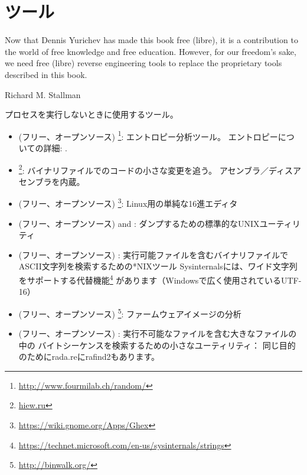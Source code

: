 \chapter{ツール}

\epigraph{Now that Dennis Yurichev has made this book free (libre), it is a
contribution to the world of free knowledge and free education.
However, for our freedom's sake, we need free (libre) reverse
engineering tools to replace the proprietary tools described in this book.}{Richard M. Stallman}


プロセスを実行しないときに使用するツール。


\begin{itemize}
\item
(フリー、オープンソース) \footnote{\url{http://www.fourmilab.ch/random/}}: エントロピー分析ツール。
エントロピーについての詳細: .

\item
\label{Hiew}
\footnote{\href{http://go.yurichev.com/17035}{hiew.ru}}:
バイナリファイルでのコードの小さな変更を追う。
アセンブラ／ディスアセンブラを内蔵。

\item (フリー、オープンソース) \footnote{\url{https://wiki.gnome.org/Apps/Ghex}}: Linux用の単純な16進エディタ

\item (フリー、オープンソース)  and : ダンプするための標準的なUNIXユーティリティ

\item (フリー、オープンソース) : 実行可能ファイルを含むバイナリファイルでASCII文字列を検索するための*NIXツール
Sysinternalsには、ワイド文字列をサポートする代替機能\footnote{\url{https://technet.microsoft.com/en-us/sysinternals/strings}}
があります（Windowsで広く使用されているUTF-16）

\item (フリー、オープンソース) \footnote{\url{http://binwalk.org/}}: ファームウェアイメージの分析

\item
{}
(フリー、オープンソース) :
実行不可能なファイルを含む大きなファイルの中の
バイトシーケンスを検索するための小さなユーティリティ：\BGREPURL
{}
同じ目的のためにrada.reにrafind2もあります。
\end{itemize}

